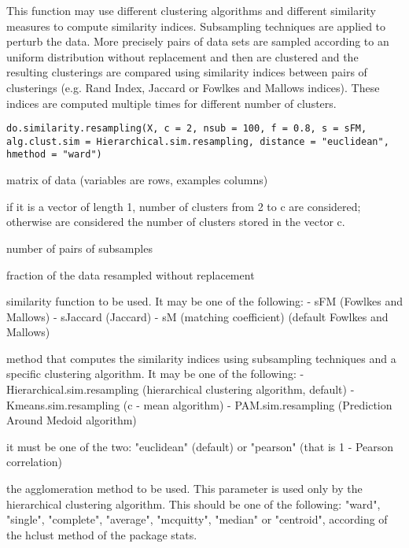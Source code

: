 \documentclass{article}
\begin{document}
\begin{Description}\relax
This function may use different clustering algorithms and different similarity measures to compute similarity indices.
Subsampling techniques are applied to perturb the data. More precisely pairs of data sets are sampled according to an uniform distribution
without replacement and then are clustered and the resulting clusterings are compared using similarity indices between pairs of clusterings
(e.g. Rand Index, Jaccard or Fowlkes and Mallows indices). These indices are computed multiple times for different number of clusters.
\end{Description}
\begin{Usage}
\begin{verbatim}
do.similarity.resampling(X, c = 2, nsub = 100, f = 0.8, s = sFM, 
alg.clust.sim = Hierarchical.sim.resampling, distance = "euclidean", hmethod = "ward")
\end{verbatim}
\end{Usage}
\begin{Arguments}
\begin{ldescription}
\item[\code{X}] matrix of data (variables are rows, examples columns)
\item[\code{c}] if it is a vector of length 1, number of clusters from 2 to c are considered; otherwise are considered 
the number of clusters stored in the vector c. 
\item[\code{nsub}] number of pairs of subsamples 
\item[\code{f}] fraction of the data resampled without replacement 
\item[\code{s}] similarity function to be used. It may be one of the following: 
- sFM (Fowlkes and Mallows)
- sJaccard (Jaccard)
- sM (matching coefficient)
(default Fowlkes and Mallows)
\item[\code{alg.clust.sim}] method that computes the similarity indices using subsampling techniques and a specific clustering algorithm. 
It may be one of the following: 
- Hierarchical.sim.resampling (hierarchical clustering algorithm, default)
- Kmeans.sim.resampling (c - mean algorithm)
- PAM.sim.resampling (Prediction Around Medoid algorithm)
\item[\code{distance}] it must be one of the two: "euclidean" (default) or "pearson" (that is 1 - Pearson correlation) 
\item[\code{hmethod}] the agglomeration method to be used. This parameter is used only by the hierarchical clustering algorithm.
This should be one of the following:
"ward", "single", "complete", "average", "mcquitty", "median" or "centroid", according of the hclust
method of the package stats. 
\end{ldescription}
\end{Arguments}
\end{document}
